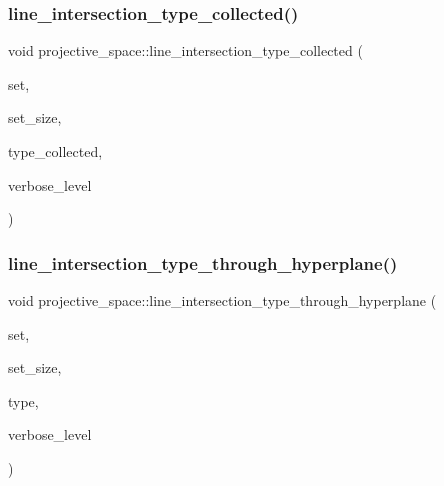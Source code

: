 \subsubsection{\texorpdfstring{line\+\_\+intersection\+\_\+type\+\_\+collected()}{line\_intersection\_type\_collected()}}
{\footnotesize\ttfamily void projective\+\_\+space\+::line\+\_\+intersection\+\_\+type\+\_\+collected (\begin{DoxyParamCaption}\item[{\mbox{\hyperlink{galois_8h_a09fddde158a3a20bd2dcadb609de11dc}{I\+NT}} $\ast$}]{set,  }\item[{\mbox{\hyperlink{galois_8h_a09fddde158a3a20bd2dcadb609de11dc}{I\+NT}}}]{set\+\_\+size,  }\item[{\mbox{\hyperlink{galois_8h_a09fddde158a3a20bd2dcadb609de11dc}{I\+NT}} $\ast$}]{type\+\_\+collected,  }\item[{\mbox{\hyperlink{galois_8h_a09fddde158a3a20bd2dcadb609de11dc}{I\+NT}}}]{verbose\+\_\+level }\end{DoxyParamCaption})}

\mbox{\label{classprojective__space_abf3cf01a1bbb77cd0296b051d86c842a}} 
\subsubsection{\texorpdfstring{line\+\_\+intersection\+\_\+type\+\_\+through\+\_\+hyperplane()}{line\_intersection\_type\_through\_hyperplane()}}
{\footnotesize\ttfamily void projective\+\_\+space\+::line\+\_\+intersection\+\_\+type\+\_\+through\+\_\+hyperplane (\begin{DoxyParamCaption}\item[{\mbox{\hyperlink{galois_8h_a09fddde158a3a20bd2dcadb609de11dc}{I\+NT}} $\ast$}]{set,  }\item[{\mbox{\hyperlink{galois_8h_a09fddde158a3a20bd2dcadb609de11dc}{I\+NT}}}]{set\+\_\+size,  }\item[{\mbox{\hyperlink{galois_8h_a09fddde158a3a20bd2dcadb609de11dc}{I\+NT}} $\ast$}]{type,  }\item[{\mbox{\hyperlink{galois_8h_a09fddde158a3a20bd2dcadb609de11dc}{I\+NT}}}]{verbose\+\_\+level }\end{DoxyParamCaption})}

